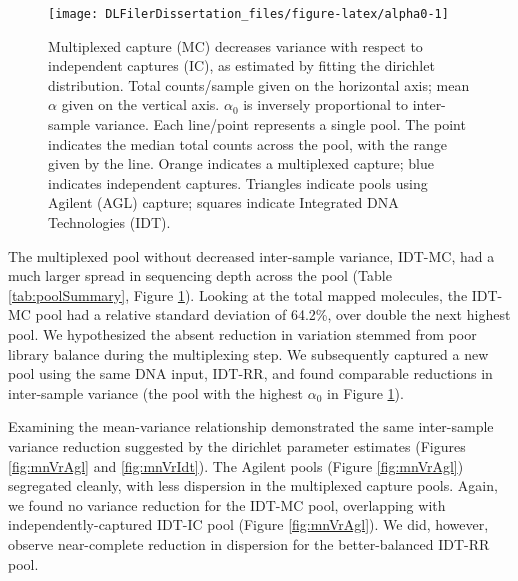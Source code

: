 \documentclass[11pt,letterpaper]{book}
\begin{document}
\begin{figure}

{\centering \texttt{[image: DLFilerDissertation\_files/figure-latex/alpha0-1]} 

}

\caption[Multiplexed capture decreases variance with respect to independent captures, as estimated by fitting the dirichlet distribution.]{Multiplexed capture (MC) decreases variance with respect to independent captures (IC), as estimated by fitting the dirichlet distribution. Total counts/sample given on the horizontal axis; mean \(\alpha\) given on the vertical axis. \(\alpha_0\) is inversely proportional to inter-sample variance. Each line/point represents a single pool. The point indicates the median total counts across the pool, with the range given by the line. Orange indicates a multiplexed capture; blue indicates independent captures. Triangles indicate pools using Agilent (AGL) capture; squares indicate Integrated DNA Technologies (IDT).}\label{fig:alpha0}
\end{figure}

The multiplexed pool without decreased inter-sample variance, IDT-MC, had a much larger spread in sequencing depth across the pool (Table \ref{tab:poolSummary}, Figure \ref{fig:alpha0}).
Looking at the total mapped molecules, the IDT-MC pool had a relative standard deviation of 64.2\%, over double the next highest pool.
We hypothesized the absent reduction in variation stemmed from poor library balance during the multiplexing step.
We subsequently captured a new pool using the same DNA input, IDT-RR, and found comparable reductions in inter-sample variance (the pool with the highest \(\alpha_0\) in Figure \ref{fig:alpha0}).

Examining the mean-variance relationship demonstrated the same inter-sample variance reduction suggested by the dirichlet parameter estimates (Figures \ref{fig:mnVrAgl} and \ref{fig:mnVrIdt}).
The Agilent pools (Figure \ref{fig:mnVrAgl}) segregated cleanly, with less dispersion in the multiplexed capture pools.
Again, we found no variance reduction for the IDT-MC pool, overlapping with independently-captured IDT-IC pool (Figure \ref{fig:mnVrAgl}).
We did, however, observe near-complete reduction in dispersion for the better-balanced IDT-RR pool.
\end{document}
